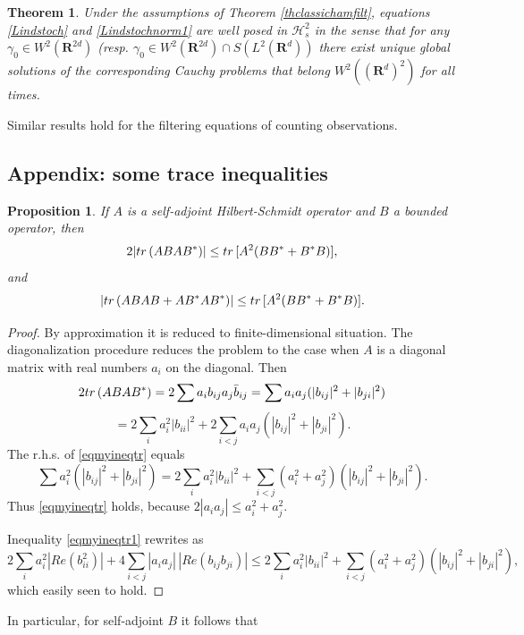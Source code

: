 \documentclass[10pt,a4paper]{amsart}
\def\HC{\mathcal{H}}
\def\R{\mathbf{R}}
\def\tr{\rm{tr}}
\def\ga{\gamma}
\newtheorem{prop}{Proposition}[section]
\newtheorem{theorem}{Theorem}[section]
\begin{document}
\begin{theorem}
\label{thclassichamfiltmix}
Under the assumptions of Theorem \ref{thclassichamfilt},  equations
  \eqref{Lindstoch} and \eqref{Lindstochnorm1} are well posed in $\HC_s^2$ in the sense that for any
  $\ga_0\in W^2(\R^{2d})$ (resp. $\ga_0\in W^2(\R^{2d})\cap S(L^2(\R^d))$ there
 exist unique global solutions of the corresponding Cauchy problems that belong
$W^2((\R^d)^2)$ for all times.
\end{theorem}

Similar results hold for the filtering equations of counting observations.


\subsection{Appendix: some trace inequalities}

\begin{prop}
If $A$ is a self-adjoint Hilbert-Schmidt operator and $B$ a bounded operator, then
\begin{equation}
\label{eqmyineqtr}
2|{\tr} \, (ABAB^*)|\le {\tr} \, [A^2(BB^*+B^*B)],
\end{equation}
and
\begin{equation}
\label{eqmyineqtr1}
|{\tr} \, (AB AB +AB^*AB^*)|\le {\tr} \, [A^2 (BB^*+B^*B)].
\end{equation}
\end{prop}

\begin{proof}
By approximation it is reduced to finite-dimensional situation. The diagonalization procedure reduces
the problem to the case when $A$ is a diagonal matrix with real numbers $a_i$ on the diagonal. Then
 \[
 2{\tr} \, (ABAB^*)
=2\sum a_ib_{ij}a_j\bar b_{ij}=\sum a_i a_j (|b_{ij}|^2+|b_{ji}|^2)
\]
\[
=2\sum_i a_i^2 |b_{ii}|^2+2\sum_{i<j}a_ia_j(|b_{ij}|^2+|b_{ji}|^2).
\]
The r.h.s. of \eqref{eqmyineqtr} equals
\[
\sum a_i^2 (|b_{ij}|^2+|b_{ji}|^2)
=2\sum_i a_i^2 |b_{ii}|^2+ \sum_{i < j}(a_i^2+a_j^2)(|b_{ij}|^2+|b_{ji}|^2).
\]
Thus \eqref{eqmyineqtr} holds, because $2|a_ia_j| \le a_i^2 +a_j^2$.

Inequality \eqref{eqmyineqtr1} rewrites as
\[
2\sum_i a_i^2 |Re (b_{ii}^2)|+4\sum_{i<j}|a_ia_j| \, |Re (b_{ij} b_{ji})|
\le 2\sum_i a_i^2 |b_{ii}|^2+ \sum_{i < j}(a_i^2+a_j^2)(|b_{ij}|^2+|b_{ji}|^2),
\]
which easily seen to hold.
\end{proof}

In particular, for self-adjoint $B$ it follows that
\end{document}
